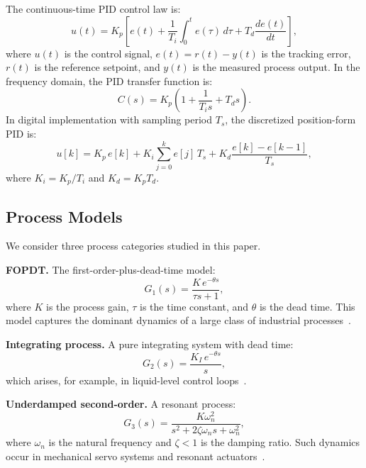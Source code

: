 \documentclass[conference,a4paper]{IEEEtran}[2015/08/26]
\begin{document}
The continuous-time PID control law is:
\begin{equation}
  u(t) = K_p \!\left[ e(t)
         + \frac{1}{T_i} \int_0^t e(\tau)\,d\tau
         + T_d \frac{de(t)}{dt} \right],
  \label{eq:pid_cont}
\end{equation}
where $u(t)$ is the control signal, $e(t) = r(t) - y(t)$ is the
tracking error, $r(t)$ is the reference setpoint, and $y(t)$ is the
measured process output. In the frequency domain, the PID transfer
function is:
\begin{equation}
  C(s) = K_p \!\left(1 + \frac{1}{T_i s} + T_d s\right).
  \label{eq:pid_tf}
\end{equation}
In digital implementation with sampling period $T_s$, the discretized
position-form PID is:
\begin{equation}
  u[k] = K_p\, e[k]
         + K_i \sum_{j=0}^{k} e[j]\,T_s
         + K_d \frac{e[k] - e[k-1]}{T_s},
  \label{eq:pid_disc}
\end{equation}
where $K_i = K_p/T_i$ and $K_d = K_p T_d$.

\subsection{Process Models}

We consider three process categories studied in this paper.

\textbf{FOPDT.} The first-order-plus-dead-time model:
\begin{equation}
  G_1(s) = \frac{K\, e^{-\theta s}}{\tau s + 1},
  \label{eq:fopdt}
\end{equation}
where $K$ is the process gain, $\tau$ is the time constant, and $\theta$
is the dead time. This model captures the dominant dynamics of a large
class of industrial processes~\cite{Seborg2016}.

\textbf{Integrating process.} A pure integrating system with dead time:
\begin{equation}
  G_2(s) = \frac{K_I\, e^{-\theta s}}{s},
  \label{eq:integ}
\end{equation}
which arises, for example, in liquid-level control loops~\cite{Ogata2010}.

\textbf{Underdamped second-order.} A resonant process:
\begin{equation}
  G_3(s) = \frac{K \omega_n^2}{s^2 + 2\zeta\omega_n s + \omega_n^2},
  \label{eq:second}
\end{equation}
where $\omega_n$ is the natural frequency and $\zeta < 1$ is the damping
ratio. Such dynamics occur in mechanical servo systems and resonant
actuators~\cite{Franklin2018}.
\end{document}
